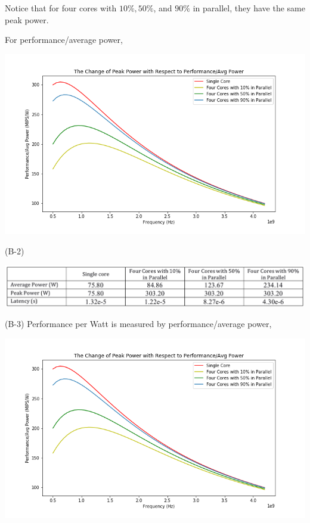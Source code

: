 \documentclass[11pt]{article}
\begin{document}
\begin{solution}
\item Notice that for four cores with $10\%, 50\%$, and $90\%$ in parallel, they have the same peak power.
\item For performance/average power,
\begin{center}
\includegraphics[width=15cm]{B1_3.png}
\end{center}
\pagebreak
\item (B-2)
\begin{center}
\includegraphics[width=15cm]{table.png}
\end{center}
\item (B-3) Performance per Watt is measured by performance/average power,
\begin{center}
\includegraphics[width=15cm]{B1_3.png}
\end{center}

\end{solution}
\end{document}
